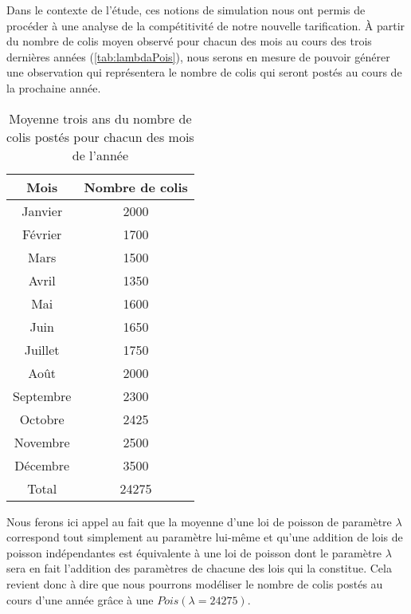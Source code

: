 Dans le contexte de l'étude, ces notions de simulation nous ont permis de procéder à une analyse de la compétitivité de notre nouvelle tarification. À partir du nombre de colis moyen observé pour chacun des mois au cours des trois dernières années (\autoref{tab:lambdaPois}), nous serons en mesure de pouvoir générer une observation qui représentera le nombre de colis qui seront postés au cours de la prochaine année. \\

\begin{table}
	\centering
	\begin{tabular}{cc}
		Mois & Nombre de colis \\
		\hline
		Janvier & 2000 \\
		Février & 1700 \\
		Mars & 1500 \\
		Avril & 1350 \\
		Mai & 1600 \\
		Juin & 1650 \\
		Juillet & 1750 \\
		Août & 2000 \\
		Septembre & 2300 \\
		Octobre & 2425 \\
		Novembre & 2500 \\
		Décembre & 3500 \\
		\hline
		Total & 24275
	\end{tabular}
	\caption{Moyenne trois ans du nombre de colis postés pour chacun des mois de l'année}
	\label{tab:lambdaPois}
\end{table}

Nous ferons ici appel au fait que la moyenne d'une loi de poisson de paramètre $\lambda$ correspond tout simplement au paramètre lui-même et qu'une addition de lois de poisson indépendantes est équivalente à une loi de poisson dont le paramètre $\lambda$ sera en fait l'addition des paramètres de chacune des lois qui la constitue. Cela revient donc à dire que nous pourrons modéliser le nombre de colis postés au cours d'une année grâce à une $Pois(\lambda = 24275)$. \\


